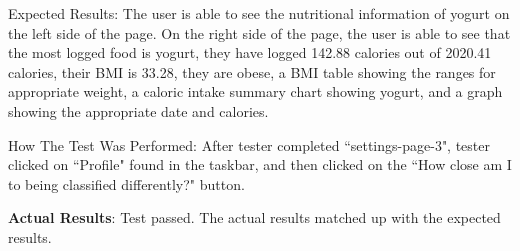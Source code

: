\documentclass[12pt, titlepage]{article}
\begin{document}
\begin{enumerate}
		Expected Results: The user is able to see the nutritional information of yogurt on the left side of the page. On the right side of the page, the user is able to see that the most logged food is yogurt, they have logged 142.88 calories out of 2020.41 calories, their BMI is 33.28, they are obese, a BMI table showing the ranges for appropriate weight, a caloric intake summary chart showing yogurt, and a graph showing the appropriate date and calories.
		
		How The Test Was Performed: After tester completed ``settings-page-3", tester clicked on ``Profile" found in the taskbar, and then clicked on the ``How close am I to being classified differently?" button.
		
		\textbf{Actual Results}: Test passed. The actual results matched up with the expected results.
		
	\end{enumerate}
\end{document}
